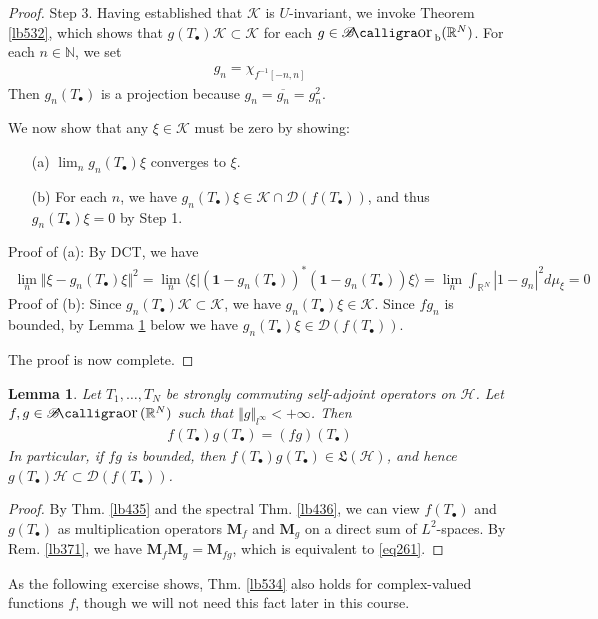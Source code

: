 \documentclass[12pt,b5paper,notitlepage]{article}
\theoremstyle{definition}
\theoremstyle{plain}
\newtheorem{lm}[df]{Lemma}
\DeclareMathOperator{\Bor}{\mathscr{B}\text{\kern -2pt {\calligra\large or}}\,}
\DeclareMathOperator{\Borb}{{\mathscr{B}\text{\kern -2pt {\calligra\large or}}\,}_{\mathrm b}}
\newcommand{\fk}{\mathfrak}
\newcommand{\ovl}{\overline}
\newcommand{\idt}{\mathbf{1}}
\newcommand{\Dom}{\mathscr{D}}
\newcommand{\bk}[1]{\langle {#1}\rangle}
\newcommand{\blt}{\bullet}
\newcommand{\Nbb}{\mathbb N}
\newcommand{\Rbb}{\mathbb R}
\newcommand{\MH}{\mathcal H}
\newcommand{\MK}{\mathcal K}
\newcommand{\Mbf}{\mathbf M}
\numberwithin{equation}{section}
\begin{document}
\begin{proof}
Step 3. Having established that $\MK$ is $U$-invariant, we invoke Theorem \ref{lb532}, which shows that $g(T_\blt)\MK\subset\MK$ for each $g\in\Borb(\Rbb^N)$. For each $n\in\Nbb$, we set
\begin{align*}
g_n=\chi_{f^{-1}[-n,n]}
\end{align*} 
Then $g_n(T_\blt)$ is a projection because $g_n=\ovl{g_n}=g_n^2$.

We now show that any $\xi\in\MK$ must be zero by showing:
\begin{enumerate}
\item[(a)] $\lim_ng_n(T_\blt)\xi$ converges to $\xi$.
\item[(b)] For each $n$, we have $g_n(T_\blt)\xi\in\MK\cap\Dom(f(T_\blt))$, and thus $g_n(T_\blt)\xi=0$ by Step 1.
\end{enumerate}
Proof of (a): By DCT, we have
\begin{align*}
\lim_n\Vert \xi-g_n(T_\blt)\xi\Vert^2=\lim_n\bk{\xi|(\idt-g_n(T_\blt))^*(\idt-g_n(T_\blt))\xi}=\lim_n\int_{\Rbb^N} |1-g_n|^2d\mu_\xi=0
\end{align*} 
Proof of (b): Since $g_n(T_\blt)\MK\subset\MK$, we have $g_n(T_\blt)\xi\in\MK$. Since $fg_n$ is bounded, by Lemma \ref{lb535} below we have $g_n(T_\blt)\xi\in\Dom(f(T_\blt))$.

The proof is now complete.
\end{proof}


\begin{lm}\label{lb535}
Let $T_1,\dots,T_N$ be strongly commuting self-adjoint operators on $\MH$. Let $f,g\in\Bor(\Rbb^N)$ such that $\Vert g\Vert_{l^\infty}<+\infty$. Then
\begin{align}\label{eq261}
f(T_\blt)g(T_\blt)=(fg)(T_\blt)
\end{align}
In particular, if $fg$ is bounded, then $f(T_\blt)g(T_\blt)\in\fk L(\MH)$, and hence $g(T_\blt)\MH\subset\Dom(f(T_\blt))$.
\end{lm}

\begin{proof}
By Thm. \ref{lb435} and the spectral Thm. \ref{lb436}, we can view $f(T_\blt)$ and $g(T_\blt)$ as multiplication operators $\Mbf_f$ and $\Mbf_g$ on a direct sum of $L^2$-spaces. By Rem. \ref{lb371}, we have $\Mbf_f\Mbf_g=\Mbf_{fg}$, which is equivalent to \eqref{eq261}.
\end{proof}


As the following exercise shows, Thm. \ref{lb534} also holds for complex-valued functions $f$, though we will not need this fact later in this course.
\end{document}
